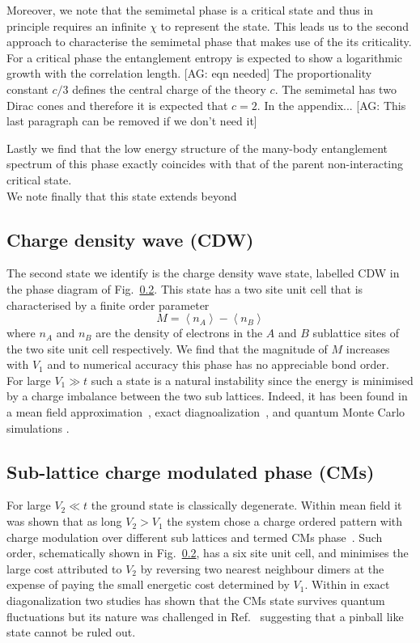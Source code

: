 \documentclass[aps,prx,10pt,twocolumn,floatfix,superscriptaddress,showpacs,numerical,footinbib]{revtex4-1}
\newcommand{\noteAG}[1]{{\color{blue} [AG: #1]}}
\begin{document}
%
Moreover, we note that the semimetal phase is a critical state and thus in principle requires an infinite $\chi$ to represent the state.
%
This leads us to the second approach to characterise the semimetal phase that makes use of the its criticality.
%
For a critical phase the entanglement entropy is expected to show a logarithmic growth with the correlation length.
\noteAG{eqn needed}
%
The proportionality constant $c/3$ defines the central charge of the theory $c$. 
%
The semimetal has two Dirac cones and therefore it is expected that $c=2$. 
%
In the appendix...
\noteAG{This last paragraph can be removed if we don't need it}

%
Lastly we find that the low energy structure of the many-body 
entanglement spectrum of this phase exactly coincides with that of the parent non-interacting critical state.\\ 
%

%
We note finally that this state extends beyond 

\subsection{Charge density wave (CDW)}
%
The second state we identify is the charge density wave state, labelled CDW in the phase diagram of Fig.~\ref{}.
%
This state has a two site unit cell that is characterised by a finite order parameter
%
\begin{equation}
\label{eq:CDW}
%
M=\left\langle n_{A} \right\rangle-\left\langle n_{B}\right\rangle
%
\end{equation}
%
where $n_{A}$ and $n_{B}$ are the density of electrons in the $A$ and $B$ sublattice sites of the two site unit cell respectively.
%
We find that the magnitude of $M$ increases with $V_{1}$ and to numerical accuracy this phase has no appreciable bond order.\\
%

For large $V_{1}\gg t$ such a state is a natural instability since the energy is minimised by a charge imbalance between the two sub lattices.
%
Indeed, it has been found in a mean field approximation~\cite{Raghu,Franz,us}, exact diagnoalization~\cite{us,daghofer,herbut}, and quantum Monte Carlo simulations
\cite{QMC}.
%


\subsection{Sub-lattice charge modulated phase (CMs)}
%
For large $V_{2}\ll t$ the ground state is classically degenerate. 
%
Within mean field it was shown that as long $V_{2}>V_{1}$
the system chose a charge ordered pattern with charge modulation over different sub lattices and termed CMs phase~\cite{CMs}.
%
Such order, schematically shown in Fig.~\ref{}, has a six site unit cell, and minimises the large cost
attributed to $V_{2}$ by reversing two nearest neighbour dimers at the expense of paying the small energetic cost
determined by $V_{1}$.
%
Within in exact diagonalization two studies has shown that the CMs state survives quantum fluctuations 
but its nature was challenged in Ref.~ suggesting that a pinball like state cannot be ruled out.\\
\end{document}

